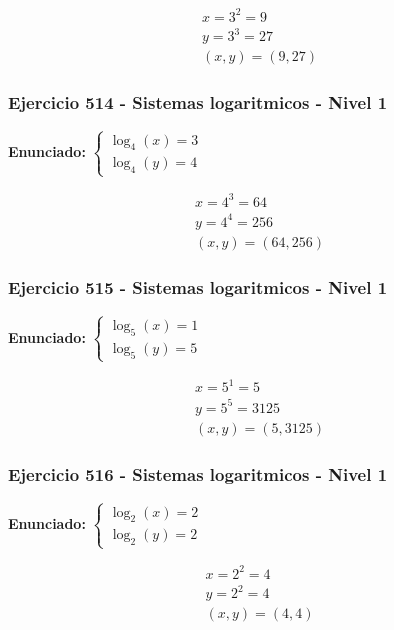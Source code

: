 \documentclass[12pt,a4paper]{article}
\begin{document}
\[
\begin{aligned}
x=3^{2}=9\\
y=3^{3}=27\\
\boxed{(x,y)=(9,27)}
\end{aligned}
\]


\subsubsection*{Ejercicio 514 - Sistemas logaritmicos - Nivel 1}
\textbf{Enunciado:} \(\begin{cases} \log_{4}\left(x\right)=3\\ \log_{4}\left(y\right)=4\end{cases}\)

\[
\begin{aligned}
x=4^{3}=64\\
y=4^{4}=256\\
\boxed{(x,y)=(64,256)}
\end{aligned}
\]


\subsubsection*{Ejercicio 515 - Sistemas logaritmicos - Nivel 1}
\textbf{Enunciado:} \(\begin{cases} \log_{5}\left(x\right)=1\\ \log_{5}\left(y\right)=5\end{cases}\)

\[
\begin{aligned}
x=5^{1}=5\\
y=5^{5}=3125\\
\boxed{(x,y)=(5,3125)}
\end{aligned}
\]


\subsubsection*{Ejercicio 516 - Sistemas logaritmicos - Nivel 1}
\textbf{Enunciado:} \(\begin{cases} \log_{2}\left(x\right)=2\\ \log_{2}\left(y\right)=2\end{cases}\)

\[
\begin{aligned}
x=2^{2}=4\\
y=2^{2}=4\\
\boxed{(x,y)=(4,4)}
\end{aligned}
\]
\end{document}
